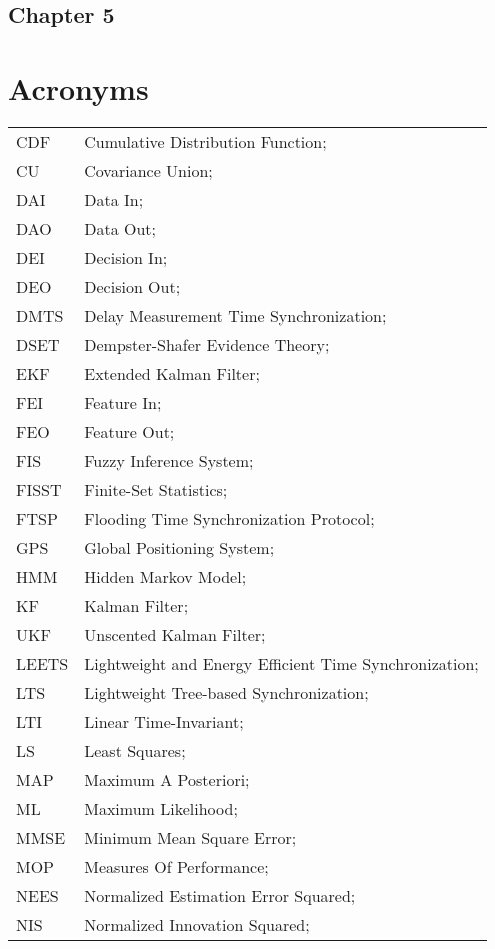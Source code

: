 \subsection*{Chapter 5}

\newpage
\section*{Acronyms}
\begin{longtable}{ll}
	CDF			& Cumulative Distribution Function; \\
	CU			& Covariance Union; \\
	DAI			& Data In; \\
	DAO			& Data Out; \\
	DEI			& Decision In; \\
	DEO 		& Decision Out; \\
	DMTS		& Delay Measurement Time Synchronization; \\
	DSET 		& Dempster-Shafer Evidence Theory; \\		
	EKF			& Extended Kalman Filter; \\
	FEI			& Feature In; \\
	FEO			& Feature Out; \\
	FIS			& Fuzzy Inference System; \\
	FISST		& Finite-Set Statistics; \\
	FTSP		& Flooding Time Synchronization Protocol; \\
	GPS			& Global Positioning System; \\
	HMM			& Hidden Markov Model; \\
	KF 			& Kalman Filter; \\
	UKF			& Unscented Kalman Filter; \\
	LEETS		& Lightweight and Energy Efficient Time Synchronization; \\
	LTS			& Lightweight Tree-based Synchronization; \\
	LTI			& Linear Time-Invariant; \\
	LS			& Least Squares; \\
	MAP			& Maximum A Posteriori; \\
	ML			& Maximum Likelihood; \\
	MMSE		& Minimum Mean Square Error; \\
	MOP 		& Measures Of Performance; \\
	NEES		& Normalized Estimation Error Squared; \\
	NIS			& Normalized Innovation Squared; \\

\end{longtable}
